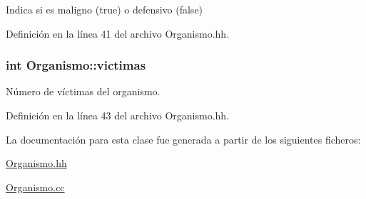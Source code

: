 Indica si es maligno (true) o defensivo (false) 



Definición en la línea 41 del archivo Organismo.\+hh.

\hypertarget{class_organismo_abb3e56487a080df544a6ff96e5e42520}{
\subsubsection[{victimas}]{\setlength{\rightskip}{0pt plus 5cm}int Organismo\+::victimas\hspace{0.3cm}{\ttfamily [private]}}}\label{class_organismo_abb3e56487a080df544a6ff96e5e42520}


Número de víctimas del organismo. 



Definición en la línea 43 del archivo Organismo.\+hh.



La documentación para esta clase fue generada a partir de los siguientes ficheros\+:\begin{DoxyCompactItemize}
\item 
\hyperlink{_organismo_8hh}{Organismo.\+hh}\item 
\hyperlink{_organismo_8cc}{Organismo.\+cc}\end{DoxyCompactItemize}
